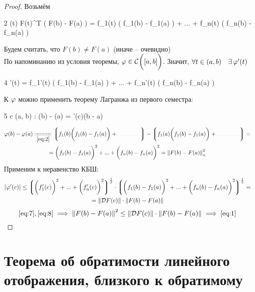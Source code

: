 \begin{proof}
	Возьмём
	\begin{equ}2
		\vphi(t)  F(t)^T \bigg( F(b) - F(a) \bigg) = f_1(t) \bigg( f_1(b) - f_1(a) \bigg) + ... + f_n(t) \bigg( f_n(b) - f_n(a) \bigg)
	\end{equ}
	Будем считать, что $ F(b) \ne F(a) $ (иначе -- очевидно) \\
	По напоминанию из условия теоремы, $ \varphi \in \mathcal{C}^{} \bigg( {[a, b]} \bigg)  $. Значит, $ \forall t \in (a, b) \quad \exists\, \varphi'(t) $
	\begin{equ}4
		\vphi'(t) = f_1'(t) \bigg( f_1(b) - f_1(a) \bigg) + ... + f_n'(t) \bigg( f_n(b) - f_n(a) \bigg)
	\end{equ}
	К $ \varphi $ можно применить теорему Лагранжа из первого семестра:
	\begin{equ}5
		\exist c \in (a, b) : \vphi(b) - \vphi(a) = \vphi'(c)(b - a)
	\end{equ}
	\begin{multline}\lbl7
		\vphi(b) - \vphi(a) \undereq{\eref2} \bigg\lgroup f_1(b) \bigg(f_1(b) - f_1(a) \bigg) + \widedots[4em] \bigg\rgroup - \bigg\lgroup f_1(a) \bigg( f_1(b) - f_1(a) \bigg) + \widedots[4em] \bigg\rgroup = \\
		= \bigg( f_1(b) - f_1(a) \bigg)^2 + ... + \bigg( f_n(b) - f_n(a) \bigg)^2 = \norm{F(b) - F(a)}_n^2
	\end{multline}
	Применим к  неравенство КБШ:
	\begin{multline}\lbl8
		|\vphi'(c)| \le \bigg\lgroup \bigg( f_1'(c) \bigg)^2 + ... + \bigg(f_n'(c) \bigg)^2 \bigg\rgroup^\frac12 \cdot \bigg\lgroup \bigg( f_1(b) - f_1(a) \bigg)^2 + ... + \bigg( f_n(b) - f_n(a) \bigg)^2 \bigg\rgroup^\frac12 = \\
		= \norm{\mc{D}F(c)} \cdot \norm{F(b) - F(a)}
	\end{multline}
	$$ \eref7, \eref8 \implies \norm{F(b) - F(a)}^2 \le \norm{\mc{D}F(c)} \cdot \norm{F(b) - F(a)} \implies \eref1 $$
\end{proof}

\section{Теорема об обратимости линейного отображения, близкого к обратимому}

